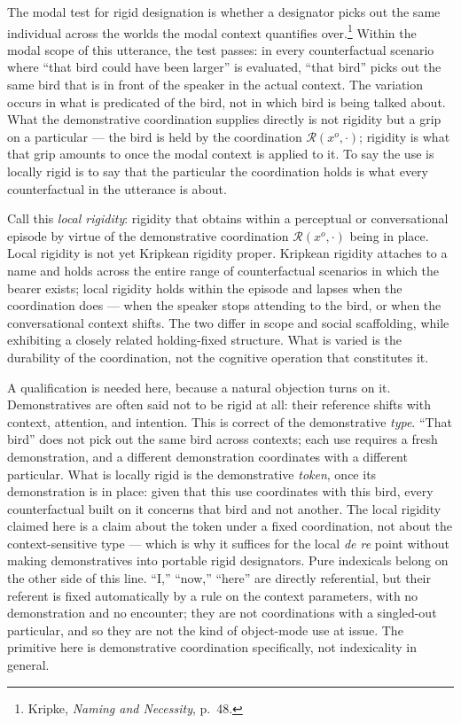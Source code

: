 \documentclass[12pt,a4paper]{article}
\begin{document}
The modal test for rigid designation is whether a designator picks out the same individual across the worlds the modal context quantifies over.\footnote{Kripke, \emph{Naming and Necessity}, p.~48.} Within the modal scope of this utterance, the test passes: in every counterfactual scenario where ``that bird could have been larger'' is evaluated, ``that bird'' picks out the same bird that is in front of the speaker in the actual context. The variation occurs in what is predicated of the bird, not in which bird is being talked about. What the demonstrative coordination supplies directly is not rigidity but a grip on a particular --- the bird is held by the coordination \(\mathcal{R}(x^o, \cdot)\); rigidity is what that grip amounts to once the modal context is applied to it. To say the use is locally rigid is to say that the particular the coordination holds is what every counterfactual in the utterance is about.

Call this \emph{local rigidity}: rigidity that obtains within a perceptual or conversational episode by virtue of the demonstrative coordination \(\mathcal{R}(x^o, \cdot)\) being in place. Local rigidity is not yet Kripkean rigidity proper. Kripkean rigidity attaches to a name and holds across the entire range of counterfactual scenarios in which the bearer exists; local rigidity holds within the episode and lapses when the coordination does --- when the speaker stops attending to the bird, or when the conversational context shifts. The two differ in scope and social scaffolding, while exhibiting a closely related holding-fixed structure. What is varied is the durability of the coordination, not the cognitive operation that constitutes it.

A qualification is needed here, because a natural objection turns on it. Demonstratives are often said not to be rigid at all: their reference shifts with context, attention, and intention. This is correct of the demonstrative \emph{type}. ``That bird'' does not pick out the same bird across contexts; each use requires a fresh demonstration, and a different demonstration coordinates with a different particular. What is locally rigid is the demonstrative \emph{token}, once its demonstration is in place: given that this use coordinates with this bird, every counterfactual built on it concerns that bird and not another. The local rigidity claimed here is a claim about the token under a fixed coordination, not about the context-sensitive type --- which is why it suffices for the local \emph{de re} point without making demonstratives into portable rigid designators. Pure indexicals belong on the other side of this line. ``I,'' ``now,'' ``here'' are directly referential, but their referent is fixed automatically by a rule on the context parameters, with no demonstration and no encounter; they are not coordinations with a singled-out particular, and so they are not the kind of object-mode use at issue. The primitive here is demonstrative coordination specifically, not indexicality in general.
\end{document}
